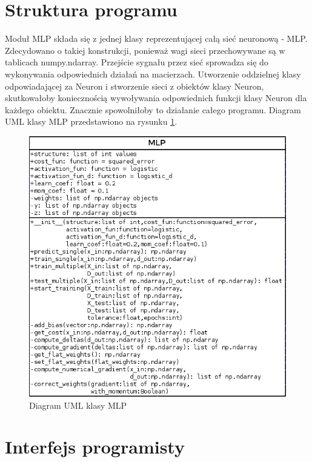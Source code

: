 \section{Struktura programu}
\label{Sec:MLPStruct}
Moduł MLP składa się z jednej klasy reprezentującej całą sieć neuronową - MLP. Zdecydowano o takiej konstrukcji, ponieważ wagi sieci przechowywane są w tablicach numpy.ndarray. Przejście sygnału przez sieć sprowadza się do wykonywania odpowiednich działań na macierzach. Utworzenie oddzielnej klasy odpowiadającej za Neuron i stworzenie sieci z obiektów klasy Neuron, skutkowałoby koniecznością wywoływania odpowiednich funkcji klasy Neuron dla każdego obiektu. Znacznie spowolniłoby to działanie całego programu. Diagram UML klasy MLP przedstawiono na rysunku \ref{fig:mlp01}.

\begin{figure}
\includegraphics[width=\textwidth]{mlp01.png}
\caption{Diagram UML klasy MLP}
\label{fig:mlp01}
\end{figure}

\pagebreak

\section{Interfejs programisty}
\label{Sec:MLPAPI}

